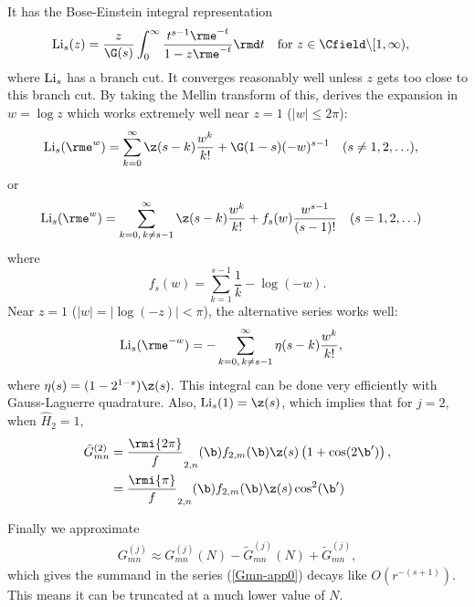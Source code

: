 \documentclass[a4paper,10pt]{article}
\begin{document}
It has the Bose-Einstein integral representation
\begin{align}
{\rm Li}_{s}(z)
&=\frac{z}{\G(s)}\int_{0}^{\infty}\frac{t^{s-1}\rme^{-t}}{1-z\rme^{-t}}\rmd t
\quad\text{for }z\in\Cfield\backslash[1,\infty),
\end{align}
where ${\rm Li}_{s}$ has a branch cut. It converges reasonably well unless $z$ gets too close to this branch cut. By taking the Mellin transform of this, \cite{wood1992-polylog-techrep} derives the expansion in $w=\log z$ which works extremely well near $z=1$ ($|w|\leq 2\pi$):
\begin{align}
{\rm Li}_{s}(\rme^{w})
&=\sum_{k=0}^{\infty}\z(s-k)\frac{w^{k}}{k!}+\G(1-s)(-w)^{s-1}
\quad\text{($s\neq1,2,\ldots$)},
\end{align}
or 
\begin{align}
{\rm Li}_{s}(\rme^{w})
&=\sum_{k=0,\,k\neq s-1}^{\infty}\z(s-k)\frac{w^{k}}{k!}+
f_{s}(w)\frac{w^{s-1}}{(s-1)!}
\quad\text{($s=1,2,\ldots$)}
\end{align}
where
\[f_{s}(w)=\sum_{k=1}^{s-1}\frac1k-\log(-w).\]
Near $z=1$ ($|w|=|\log(-z)|<\pi$), the alternative series works well:
\begin{align}
{\rm Li}_{s}(\rme^{-w})
&=-\sum_{k=0,\,k\neq s-1}^{\infty}\eta(s-k)\frac{w^{k}}{k!},
\end{align}
where $\eta(s)=(1-2^{1-s})\z(s).$
This integral can be done very efficiently with Gauss-Laguerre quadrature. Also, ${\rm Li}_{s}(1)=\z(s)$, which implies that for $j=2$, when $\hat H_{2}=1$,
\begin{align}\label{Gmn-app}
\tilde G_{mn}^{(2)}
&=\frac\rmi{2\pi} f_{2,n}(\b)f_{2,m}(\b)\z(s)
 \left ( 1+\cos(2\b')\right),
 \notag\\
 &=\frac\rmi{\pi} f_{2,n}(\b)f_{2,m}(\b)\z(s)\cos^{2}(\b')
 \end{align}
 
 Finally we approximate
 \begin{align}
G_{mn}^{(j)}\approx G_{mn}^{(j)}(N)-\tilde G_{mn}^{(j)}(N)+ \tilde G_{mn}^{(j)},
\end{align}
which gives the summand in the series (\ref{Gmn-app0}) decays like $O(r^{-(s+1)})$.
This means it can be truncated at a much lower value of $N$.%



\end{document}
